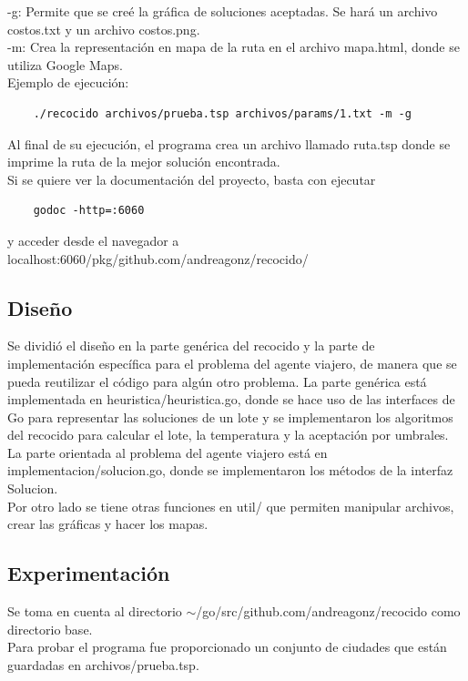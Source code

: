 \documentclass[12pt]{article}
\begin{document}
\textsf{-g}: Permite que se creé la gráfica de soluciones aceptadas. Se hará un archivo \textsf{costos.txt} y un archivo \textsf{costos.png}. \\

\textsf{-m}: Crea la representación en mapa de la ruta en el archivo \textsf{mapa.html}, donde se utiliza Google Maps. \\

Ejemplo de ejecución: 
\begin{verbatim}
    ./recocido archivos/prueba.tsp archivos/params/1.txt -m -g
\end{verbatim}

Al final de su ejecución, el programa crea un archivo llamado \textsf{ruta.tsp} donde se imprime la ruta de la mejor solución encontrada. \\

Si se quiere ver la documentación del proyecto, basta con ejecutar
\begin{verbatim}
    godoc -http=:6060
\end{verbatim}
y acceder desde el navegador a \textsf{localhost:6060/pkg/github.com/andreagonz/recocido/}

\newpage

\subsection{Diseño}
Se dividió el diseño en la parte genérica del recocido y la parte de implementación específica para el problema del agente viajero, de manera que se pueda reutilizar el código para algún otro problema. La parte genérica está implementada en \textsf{heuristica/heuristica.go}, donde se hace uso de las interfaces de Go para representar las soluciones de un lote y se implementaron los algoritmos del recocido para calcular el lote, la temperatura y la aceptación por umbrales. La parte orientada al problema del agente viajero está en \textsf{implementacion/solucion.go}, donde se implementaron los métodos de la interfaz \textsf{Solucion}. \\

Por otro lado se tiene otras funciones en \textsf{util/} que permiten manipular archivos, crear las gráficas y hacer los mapas.

\subsection{Experimentación}
Se toma en cuenta al directorio \textsf{$\sim$/go/src/github.com/andreagonz/recocido} como directorio base. \\
Para probar el programa fue proporcionado un conjunto de ciudades que están guardadas en \textsf{archivos/prueba.tsp}. \\
\end{document}
